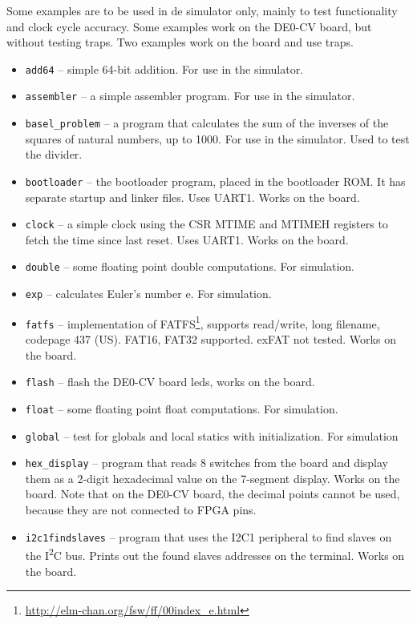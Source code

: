 \documentclass[12pt]{article}
\begin{document}
Some examples are to be used in de simulator only, mainly to test functionality and clock cycle accuracy. Some examples work on the DE0-CV board, but without testing traps. Two examples work on the board and use traps.

\begin{itemize}
\item \lstinline|add64| -- simple 64-bit addition. For use in the simulator.
\item \lstinline|assembler| -- a simple assembler program. For use in the simulator.
\item \lstinline|basel_problem| -- a program that calculates the sum of the inverses of the squares of natural numbers, up to 1000. For use in the simulator. Used to test the divider.
\item \lstinline|bootloader| -- the bootloader program, placed in the bootloader ROM. It has separate startup and linker files. Uses UART1. Works on the board.
\item \lstinline|clock| -- a simple clock using the CSR MTIME and MTIMEH registers to fetch the time since last reset. Uses UART1. Works on the board.
\item \lstinline|double| -- some floating point double computations. For simulation.
\item \lstinline|exp| -- calculates Euler's number e. For simulation.
\item \lstinline|fatfs| -- implementation of FATFS\footnote{\url{http://elm-chan.org/fsw/ff/00index_e.html}}, supports read/write, long filename, codepage 437 (US). FAT16, FAT32 supported. exFAT not tested. Works on the board.
\item \lstinline|flash| -- flash the DE0-CV board leds, works on the board.
\item \lstinline|float| -- some floating point float computations. For simulation.
\item \lstinline|global| -- test for globals and local statics with initialization. For simulation
\item \lstinline|hex_display| -- program that reads 8 switches from the board and display them as a 2-digit hexadecimal value on the 7-segment display. Works on the board. Note that on the DE0-CV board, the decimal points cannot be used, because they are not connected to FPGA pins.
\item \lstinline|i2c1findslaves| -- program that uses the I2C1 peripheral to find slaves on the I\textsuperscript{2}C bus. Prints out the found slaves addresses on the terminal. Works on the board.

\end{itemize}
\end{document}
